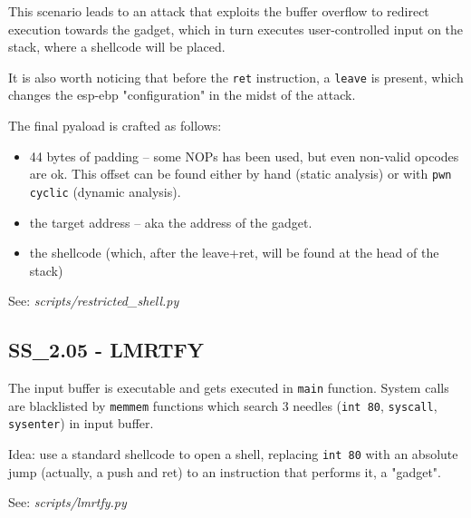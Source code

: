 This scenario leads to an attack that exploits the buffer overflow to redirect execution towards the gadget, which in turn executes user-controlled input on the stack, where a shellcode will be placed.

It is also worth noticing that before the \texttt{ret} instruction, a \texttt{leave} is present, which changes the esp-ebp "configuration" in the midst of the attack.

The final pyaload is crafted as follows:
\begin{itemize}
  \item 44 bytes of padding -- some NOPs has been used, but even non-valid opcodes are ok. This offset can be found either by hand (static analysis) or with \texttt{pwn cyclic} (dynamic analysis).
  \item the target address -- aka the address of the gadget.
  \item the shellcode (which, after the leave+ret, will be found at the head of the stack)
\end{itemize}

See: \textit{scripts/restricted_shell.py}

\subsection{SS_2.05 - LMRTFY}
The input buffer is executable and gets executed in \texttt{main} function.
System calls are blacklisted by \texttt{memmem} functions which search 3 needles (\texttt{int 80}, \texttt{syscall}, \texttt{sysenter}) in input buffer.

Idea: use a standard shellcode to open a shell, replacing \texttt{int 80} with an absolute jump (actually, a push and ret) to an instruction that performs it, a "gadget".

See: \textit{scripts/lmrtfy.py}
